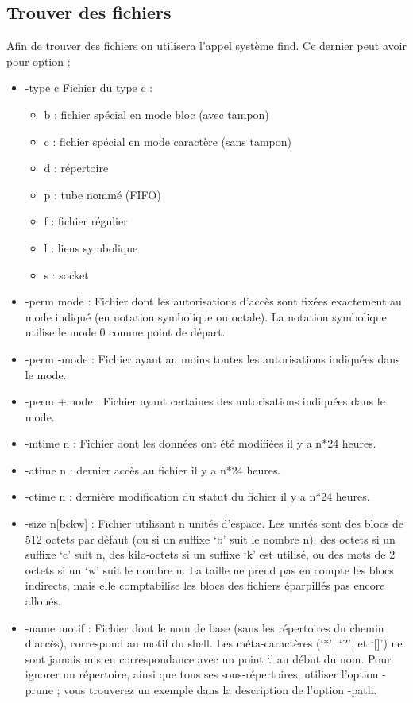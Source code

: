 \documentclass{article}[12pt]
\begin{document}
\subsection{ Trouver des fichiers}
Afin de trouver des fichiers on utilisera l'appel système find. Ce dernier peut avoir pour option :
\begin{itemize}
\item  -type c Fichier du type c :
\begin{itemize}
\item b : fichier spécial en mode bloc (avec tampon)
\item c : fichier spécial en mode caractère (sans tampon)
\item d : répertoire
\item p : tube nommé (FIFO)
\item f : fichier régulier
\item l : liens symbolique
\item s : socket
\end{itemize}
\item -perm mode : Fichier dont les autorisations d'accès sont fixées exactement au mode indiqué (en notation symbolique ou octale). La notation symbolique utilise le mode 0 comme point de départ.
\item -perm -mode : Fichier ayant au moins toutes les autorisations indiquées dans le mode.
\item -perm +mode : Fichier ayant certaines des autorisations indiquées dans le mode.
\item -mtime n : Fichier dont les données ont été modifiées il y a n*24 heures.
\item -atime n : dernier accès au fichier il y a n*24 heures.
\item -ctime n : dernière modification du statut du fichier il y a n*24 heures.
\item -size n[bckw] : Fichier utilisant n unités d'espace. Les unités sont des blocs de 512 octets par défaut (ou si un suffixe `b' suit le nombre n), des octets si un suffixe `c' suit n, des kilo-octets si un suffixe `k' est utilisé, ou des mots de 2 octets si un `w' suit le nombre n. La taille ne prend pas en compte les blocs indirects, mais elle comptabilise les blocs des fichiers éparpillés pas encore alloués.
\item -name motif : Fichier dont le nom de base (sans les répertoires du chemin d'accès), correspond au motif du shell. Les méta-caractères (`*', `?', et `[]') ne sont jamais mis en correspondance avec un point `.' au début du nom. Pour ignorer un répertoire, ainsi que tous ses sous-répertoires, utiliser l'option -prune ; vous trouverez un exemple dans la description de l'option -path.

\end{itemize}
\end{document}
